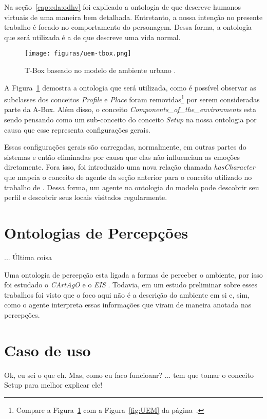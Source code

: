 Na seção~\ref{cap:eda:odhv} foi explicado a ontologia de
\citet{Gutierrez:2007:OVH:1229160.1229164} que descreve humanos virtuais de
uma maneira bem detalhada. Entretanto, a nossa intenção no presente trabalho é
focado no comportamento do personagem. Dessa forma, a ontologia que será
utilizada é a de \citet{paiva2005ontology} que descreve uma vida normal.

\begin{figure}[t]
  \centering
    \texttt{[image: figuras/uem-tbox.png]}
  \caption{T-Box baseado no modelo de ambiente urbano \cite{paiva2005ontology}.}
  \label{fig:UEM:TBOX}
\end{figure}

A Figura~\ref{fig:UEM:TBOX} demostra a ontologia que será utilizada, como é
possível observar as subclasses dos conceitos \emph{Profile} e \emph{Place}
foram removidas\footnote{Compare a Figura~\ref{fig:UEM:TBOX} com a
Figura~\ref{fig:UEM} da página~\pageref{fig:UEM}.} por serem consideradas parte
da A-Box. Além disso, o conceito \emph{Components\_of\_the\_environments} esta
sendo pensando como um sub-conceito do conceito \emph{Setup} na nossa
ontologia por causa que esse representa configurações gerais.

Essas configurações gerais são carregadas, normalmente, em outras partes do
sistemas e então eliminadas por causa que elas não influenciam as emoções
diretamente. Fora isso, foi introduzido uma nova relação chamada
\emph{hasCharacter} que mapeia o conceito de agente da seção anterior para o
conceito utilizado no trabalho de \citet{paiva2005ontology}. Dessa forma, um
agente na ontologia do modelo \occ pode descobrir seu perfil e descobrir seus
locais visitados regularmente.

\section{Ontologias de Percepções} \label{cap:tp:odp}

... Última coisa

Uma ontologia de percepção esta ligada a formas de perceber o ambiente, por
isso foi estudado o \emph{CArtAgO} e o \emph{EIS}
. Todavia, em um estudo preliminar sobre esses trabalhos foi
visto que o foco aqui não é a descrição do ambiente em si e, sim, como o
agente interpreta essas informações que viram de maneira anotada nas
percepções\dev{}.

\section{Caso de uso} \label{cap:tp:cdu}

Ok, eu sei o que eh.
Mas, como eu faco funcioanr?
... tem que tomar o conceito Setup para melhor explicar ele!

